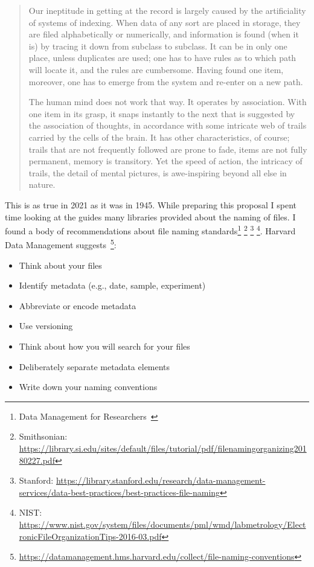 \begin{quotation}
    Our ineptitude in getting at the record is largely
    caused by the artificiality of systems of indexing. When data of any
    sort are placed in storage, they are filed alphabetically or numerically, and
    information is found (when it is) by tracing it down from subclass to
    subclass. It can be in only one place, unless duplicates are used; one
    has to have rules as to which path will locate it, and the rules are
    cumbersome. Having found one item, moreover, one has to emerge from the
    system and re-enter on a new path.

    The human mind does not work that way. It operates by association. With one
    item in its grasp, it snaps instantly to the next that is suggested by the
    association of thoughts, in accordance with some intricate web of trails
    carried by the cells of the brain. It has other characteristics, of course;
    trails that are not frequently followed are prone to fade, items are not
    fully permanent, memory is transitory. Yet the speed of action, the
    intricacy of trails, the detail of mental pictures, is awe-inspiring beyond
    all else in nature.
\end{quotation}

This is as true in 2021 as it was in 1945.  While preparing this proposal I
spent time looking at the guides many libraries provided about the naming of
files. I found a body of recommendations about file naming
standards\footnote{Data Management for
    Researchers~\cite{briney2015data}}
\footnote{Smithsonian: \url{https://library.si.edu/sites/default/files/tutorial/pdf/filenamingorganizing20180227.pdf}}
\footnote{Stanford: \url{https://library.stanford.edu/research/data-management-services/data-best-practices/best-practices-file-naming}}
\footnote{NIST: \url{https://www.nist.gov/system/files/documents/pml/wmd/labmetrology/ElectronicFileOrganizationTips-2016-03.pdf}}.
Harvard Data Management suggests~\footnote{\url{https://datamanagement.hms.harvard.edu/collect/file-naming-conventions}}:

\begin{itemize}
    \item Think about your files
    \item Identify metadata (e.g., date, sample, experiment)
    \item Abbreviate or encode metadata
    \item Use versioning
    \item Think about how you will search for your files
    \item Deliberately separate metadata elements
    \item Write down your naming conventions
\end{itemize}

